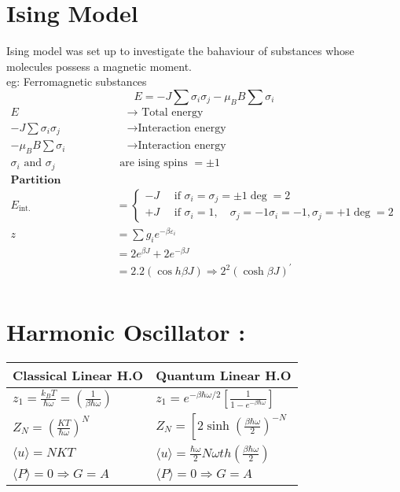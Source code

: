 \section{Ising Model}
Ising model was set up to investigate the bahaviour of substances whose molecules possess a magnetic moment.\\
eg: Ferromagnetic substances
$$E=-J \sum \sigma_{i} \sigma_{j}-\mu_{B} B \sum \sigma_{i}$$
\begin{align*}
E&\quad \rightarrow \text{ Total energy} \\
-J \sum \sigma_{i} \sigma_{j}&\quad \rightarrow  \text{Interaction energy}\\
-\mu_{B} B\sum \sigma_{i}&\quad  \rightarrow \text{Interaction energy}\\
\sigma_{i}\text{ and } \sigma_{j} &\text { are ising spins }=\pm 1\\
\textbf{Partition Function}\\
E_{\text {int. }}&=\left\{\begin{array}{l}
-J \quad \text { if } \sigma_{i}=\sigma_{j}=\pm1\operatorname{deg}=2\\
+J\quad \text { if } \sigma_{i}=1, \quad \sigma_{j}=-1 \sigma_{i}=-1, \sigma_{j}=+1\operatorname{deg}=2
\end{array}\right.\\
z&=\sum g_{i} e^{-\beta \varepsilon_{i}}\\
&=2 e^{\beta J}+2 e^{-\beta J}\\
&=2.2(\cos h \beta J) \Rightarrow 2^{2}(\cosh \beta J)^{\prime}\\
\end{align*}



\section{Harmonic Oscillator :}
\renewcommand*{\arraystretch}{2}
\begin{tabular}{|p{6cm}|p{6cm}|}
	\hline
	Classical Linear H.O&Quantum Linear H.O\\
	\hline
	$z_{1}=\frac{k_{B} T}{\hbar \omega}=\left(\frac{1}{\beta \hbar \omega}\right)$&$z_{1}=e^{-\beta \hbar \omega / 2}\left[\frac{1}{1-e^{-\beta \hbar \omega}}\right]$\\\hline
	$Z_{N}=\left(\frac{K T}{\hbar \omega}\right)^{N}$&$Z_{N}=\left[2 \sinh \left(\frac{\beta \hbar \omega }{2}\right)^{-N}\right.$\\\hline
	$\langle u\rangle=N K T$&$\langle u\rangle=\frac{\hbar \omega}{2} N \omega th\left(\frac{\beta \hbar \omega}{2}\right)$\\\hline
	$\langle P\rangle=0 \Rightarrow G=A$&$\langle P\rangle=0 \Rightarrow G=A$\\\hline
\end{tabular}



